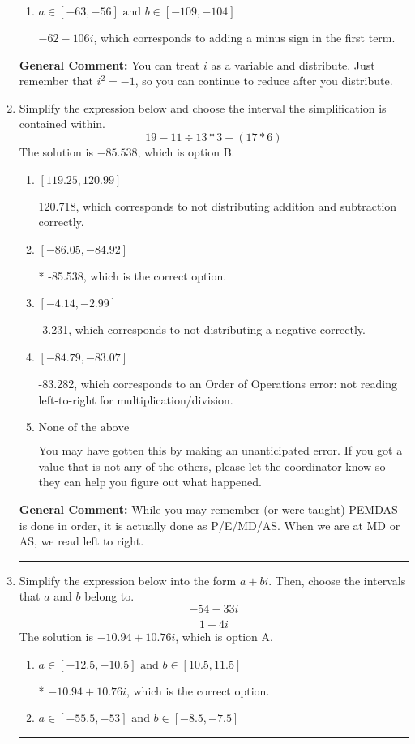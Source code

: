 \documentclass{extbook}[14pt]
\newcommand{\litem}[1]{\item #1

\rule{\textwidth}{0.4pt}}
\begin{document}
\begin{enumerate}
{\begin{enumerate}[label=\Alph*.]
 $-98 - 74 i$, which corresponds to adding a minus sign in both terms.
\item \( a \in [-63, -56] \text{ and } b \in [-109, -104] \)

 $-62 - 106 i$, which corresponds to adding a minus sign in the first term.
\end{enumerate}

\textbf{General Comment:} You can treat $i$ as a variable and distribute. Just remember that $i^2=-1$, so you can continue to reduce after you distribute.
}
\litem{
Simplify the expression below and choose the interval the simplification is contained within.
\[ 19 - 11 \div 13 * 3 - (17 * 6) \]The solution is \( -85.538 \), which is option B.\begin{enumerate}[label=\Alph*.]
\item \( [119.25, 120.99] \)

 120.718, which corresponds to not distributing addition and subtraction correctly.
\item \( [-86.05, -84.92] \)

* -85.538, which is the correct option.
\item \( [-4.14, -2.99] \)

 -3.231, which corresponds to not distributing a negative correctly.
\item \( [-84.79, -83.07] \)

 -83.282, which corresponds to an Order of Operations error: not reading left-to-right for multiplication/division.
\item \( \text{None of the above} \)

 You may have gotten this by making an unanticipated error. If you got a value that is not any of the others, please let the coordinator know so they can help you figure out what happened.
\end{enumerate}

\textbf{General Comment:} While you may remember (or were taught) PEMDAS is done in order, it is actually done as P/E/MD/AS. When we are at MD or AS, we read left to right.
}
\litem{
Simplify the expression below into the form $a+bi$. Then, choose the intervals that $a$ and $b$ belong to.
\[ \frac{-54 - 33 i}{1 + 4 i} \]The solution is \( -10.94  + 10.76 i \), which is option A.\begin{enumerate}[label=\Alph*.]
\item \( a \in [-12.5, -10.5] \text{ and } b \in [10.5, 11.5] \)

* $-10.94  + 10.76 i$, which is the correct option.
\item \( a \in [-55.5, -53] \text{ and } b \in [-8.5, -7.5] \)


\end{enumerate}}
\end{enumerate}
\end{document}
